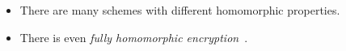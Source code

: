 \begin{frame}
  \begin{remark}
    \begin{itemize}
      \item There are many schemes with different homomorphic properties.
      \item There is even \emph{fully homomorphic 
          encryption}~\cite{GentryFullyHomomorphicEncryption}.
    \end{itemize}
  \end{remark}
\end{frame}



\begin{frame}[allowframebreaks]
  \printbibliography
\end{frame}

